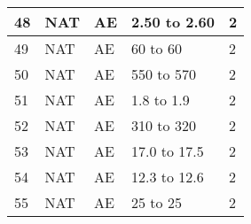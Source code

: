 \documentclass[12pt]{article}
\begin{document}
\begin{center}
\begin{longtable}{|p{2.5cm}|p{2.5cm}|p{2.5cm}|p{6cm}|p{2.5cm}|}
		\hline
		48 & NAT & AE & 2.50 to 2.60 & 2 \\
		\hline
		49 & NAT & AE & 60 to 60 & 2 \\
		\hline
		50 & NAT & AE & 550 to 570 & 2 \\
		\hline
		51 & NAT & AE & 1.8 to 1.9 & 2 \\
		\hline
		52 & NAT & AE & 310 to 320 & 2 \\
		\hline
		53 & NAT & AE & 17.0 to 17.5 & 2 \\
		\hline
		54 & NAT & AE & 12.3 to 12.6 & 2 \\
		\hline
		55 & NAT & AE & 25 to 25 & 2 \\
		\hline
	\end{longtable}
\end{center}
\end{document}
